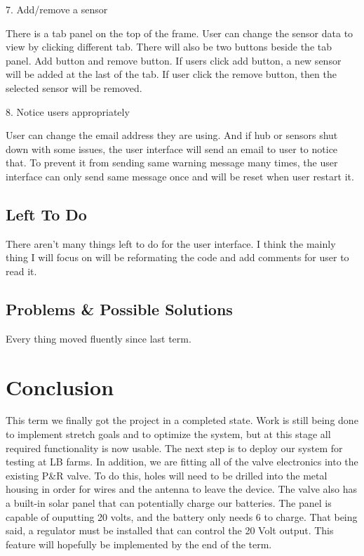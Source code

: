 \documentclass[onecolumn, draftclsnofoot,10pt, compsoc]{IEEEtran}
\begin{document}
    7.	Add/remove a sensor
    
    There is a tab panel on the top of the frame. User can change the sensor data to view by clicking different tab. There will also be two buttons beside the tab panel. Add button and remove button. If users click add button, a new sensor will be added at the last of the tab. If user click the remove button, then the selected sensor will be removed. 
    
    8.	Notice users appropriately
    
    User can change the email address they are using. And if hub or sensors shut down with some issues, the user interface will send an email to user to notice that. To prevent it from sending same warning message many times, the user interface can only send same message once and will be reset when user restart it.
    
    \subsection{Left To Do}%
    There aren't many things left to do for the user interface. I think the mainly thing I will focus on will be reformating the code and add comments for user to read it.
    
    \subsection{Problems \& Possible Solutions}%
   	Every thing moved fluently since last term. 
    
    \section{Conclusion}
    This term we finally got the project in a completed state. 
    Work is still being done to implement stretch goals and to optimize the system, but at this stage all required functionality is now usable.
    The next step is to deploy our system for testing at LB farms. 
    In addition, we are fitting all of the valve electronics into the existing P\&R valve. To do this, holes will need to be drilled into the metal housing in order for wires and the antenna to leave the device. 
    The valve also has a built-in solar panel that can potentially charge our batteries. 
    The panel is capable of ouputting 20 volts, and the battery only needs 6 to charge. 
    That being said, a regulator must be installed that can control the 20 Volt output. 
    This feature will hopefully be implemented by the end of the term. 
    
    
    \pagebreak
    
\end{document}
